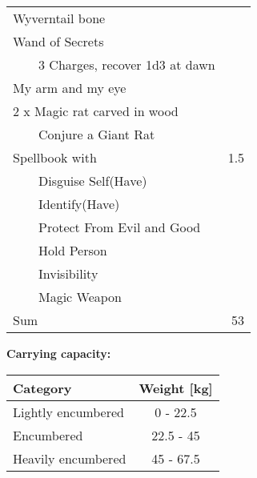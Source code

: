 \documentclass[11pt]{article}
\newcommand{\tabitem}{~~\llap{--}~~}
\begin{document}
	\begin{tabularx}{\textwidth}{X|r}
Wyverntail bone								&		\\
Wand of Secrets								&		\\
\tabitem 3 Charges, recover 1d3 at dawn		&		\\
My arm and my eye							&		\\
2 x Magic rat carved in wood				&		\\
\tabitem Conjure a Giant Rat 				&		\\
Spellbook with								& 1.5	\\
\tabitem Disguise Self(Have)				&		\\
\tabitem Identify(Have)						&       \\
\tabitem Protect From Evil and Good			&		\\
\tabitem Hold Person						&		\\
\tabitem Invisibility						&		\\
\tabitem Magic Weapon						&		\\
\hline
Sum 										& 53
	\end{tabularx}

\vspace{15mm}

\textbf{Carrying capacity:} \\

	\begin{tabular}{l|c}
Category & Weight [kg] \\
\hline
Lightly encumbered 	& 0 - 22.5 	\\
Encumbered 			& 22.5 - 45 \\
Heavily encumbered	& 45 - 67.5
	\end{tabular}
\end{document}
